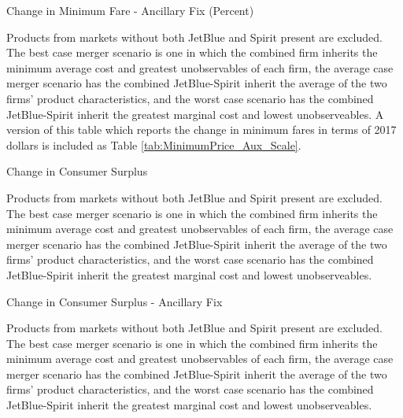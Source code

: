 \documentclass{article}
\begin{document}
        \begin{table}
        \caption{Change in Minimum Fare - Ancillary Fix (Percent)}
        \label{tab:MinimumPrice_Percent_Aux_Scale}
                \vspace{-15mm}
        \begin{center}

        \end{center}
        \vspace{-5mm}
        \footnotesize{Products from markets without both JetBlue and Spirit present are excluded. The best case merger scenario is one in which the combined firm inherits the minimum average cost and greatest unobservables of each firm, the average case merger scenario has the combined JetBlue-Spirit inherit the average of the two firms' product characteristics, and the worst case scenario has the combined JetBlue-Spirit inherit the greatest marginal cost and lowest unobserveables. A version of this table which reports the change in minimum fares in terms of 2017 dollars is included as Table \ref{tab:MinimumPrice_Aux_Scale}.}
    \end{table}    

\begin{table}
        \caption{Change in Consumer Surplus}
        \label{tab:Change_CS}
                \vspace{-15mm}
        \begin{center}

        \end{center}
        \vspace{-5mm}
        \footnotesize{Products from markets without both JetBlue and Spirit present are excluded. The best case merger scenario is one in which the combined firm inherits the minimum average cost and greatest unobservables of each firm, the average case merger scenario has the combined JetBlue-Spirit inherit the average of the two firms' product characteristics, and the worst case scenario has the combined JetBlue-Spirit inherit the greatest marginal cost and lowest unobserveables. }
    \end{table}    

\begin{table}
        \caption{Change in Consumer Surplus - Ancillary Fix}
        \label{tab:Change_CS_Anc_Fix}
                \vspace{-15mm}
        \begin{center}

        \end{center}
        \vspace{-5mm}
        \footnotesize{Products from markets without both JetBlue and Spirit present are excluded. The best case merger scenario is one in which the combined firm inherits the minimum average cost and greatest unobservables of each firm, the average case merger scenario has the combined JetBlue-Spirit inherit the average of the two firms' product characteristics, and the worst case scenario has the combined JetBlue-Spirit inherit the greatest marginal cost and lowest unobserveables. }
    \end{table}    
\end{document}
